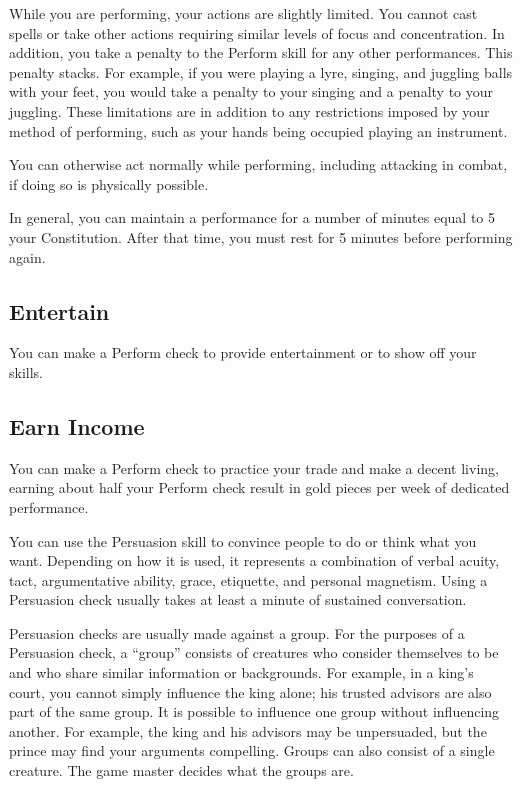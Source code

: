         While you are performing, your actions are slightly limited.
        You cannot cast spells or take other actions requiring similar levels of focus and concentration.
        In addition, you take a  penalty to the Perform skill for any other performances.
        This penalty stacks.
        For example, if you were playing a lyre, singing, and juggling balls with your feet, you would take a  penalty to your singing and a  penalty to your juggling.
        These limitations are in addition to any restrictions imposed by your method of performing, such as your hands being occupied playing an instrument.

        You can otherwise act normally while performing, including attacking in combat, if doing so is physically possible.

        In general, you can maintain a performance for a number of minutes equal to 5 \add your Constitution.
        After that time, you must rest for 5 minutes before performing again.

    \subsection{Entertain}
        You can make a Perform check to provide entertainment or to show off your skills.

    \subsection{Earn Income}
        You can make a Perform check to practice your trade and make a decent living, earning about half your Perform check result in gold pieces per week of dedicated performance.

\newpage
{}
        You can use the Persuasion skill to convince people to do or think what you want. Depending on how it is used, it represents a combination of verbal acuity, tact, argumentative ability, grace, etiquette, and personal magnetism. Using a Persuasion check usually takes at least a minute of sustained conversation.

        Persuasion checks are usually made against a group. For the purposes of a Persuasion check, a ``group'' consists of creatures who consider themselves to be  and who share similar information or backgrounds. For example, in a king's court, you cannot simply influence the king alone; his trusted advisors are also part of the same group. It is possible to influence one group without influencing another. For example, the king and his advisors may be unpersuaded, but the prince may find your arguments compelling. Groups can also consist of a single creature. The game master decides what the groups are.

